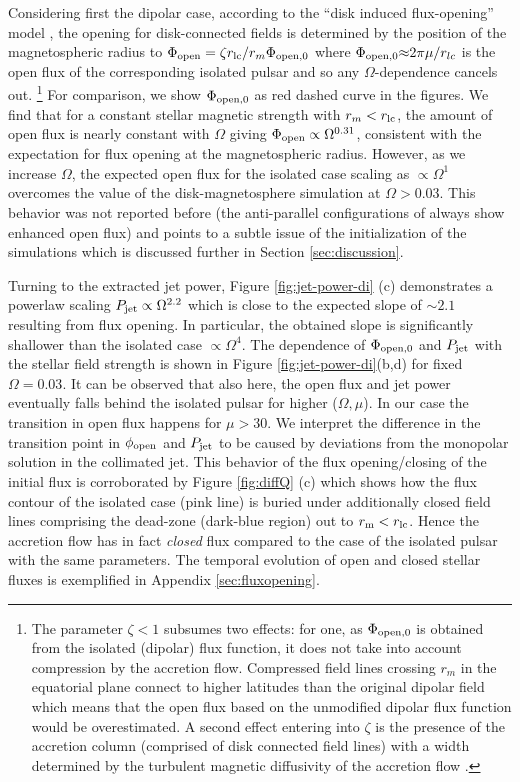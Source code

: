 \documentclass[fleqn,usenatbib]{mnras}
\begin{document}
Considering first the dipolar case, according to the ``disk induced flux-opening'' model  \citep{MattPudritz2005,Parfrey2016}, the opening for disk-connected fields is determined by the position of the magnetospheric radius to $\Phi_{\rm open} = \zeta r_{\rm lc}/r_m \Phi_{\rm open,0}$ where
$\Phi_{\rm open,0} \mathbf{\approx} 2\pi \mu/r_{lc}$ is the open flux of the corresponding isolated pulsar and so any $\Omega$-dependence cancels out.%
%
\footnote{The parameter $\zeta<1$ subsumes two effects: for one, as $\Phi_{\rm open,0}$ is obtained from the isolated (dipolar) flux function, it does not take into account compression by the accretion flow.  Compressed field lines crossing $r_m$ in the equatorial plane connect to higher latitudes than the original dipolar field which means that the open flux based on the unmodified dipolar flux function would be overestimated.  A second effect entering into $\zeta$ is the presence of the accretion column (comprised of disk connected field lines) with a width determined by the turbulent magnetic diffusivity of the accretion flow \citep{ParfreySpitkovskyEtAl2017}.}    
%
For comparison, we show $\Phi_{\rm open,0}$ as red dashed curve in the figures.
We find that for a constant stellar magnetic strength with $r_m < r_{\rm lc}$, the amount of open flux is nearly constant with $\Omega$ giving $\Phi_{\rm open} \propto \Omega^{0.31}$, consistent with the expectation for flux opening at the magnetospheric radius.  
However, as we increase $\Omega$, the expected open flux for the isolated case scaling as $\propto\Omega^1$ overcomes the value of the disk-magnetosphere simulation at $\Omega>0.03$.  This behavior was not reported before (the anti-parallel configurations of  always show enhanced open flux) and points to a subtle issue of the initialization of the simulations which is discussed further in Section \ref{sec:discussion}.  

Turning to the extracted jet power, Figure \ref{fig:jet-power-di} (c) demonstrates a powerlaw scaling $P_{\rm jet} \propto \Omega^{2.2}$ which is close to the expected slope of $\sim 2.1$ resulting from flux opening.  In particular, the obtained slope is significantly shallower than the isolated case $\propto \Omega^4$.  
The dependence of $\Phi_{\rm open,0}$ and $P_{\rm jet}$ with the stellar field strength is shown in Figure \ref{fig:jet-power-di}(b,d) for fixed $\Omega = 0.03$. 
It can be observed that also here, the open flux and jet power eventually falls behind the isolated pulsar for higher ($\Omega,\mu$). In our case the transition in open flux happens for $\mu > 30$. We interpret the difference in the transition point in $\phi_{\rm open}$ and $P_{\rm jet}$ to be caused by deviations from the monopolar solution in the collimated jet. 
This behavior of the flux opening/closing of the initial flux is corroborated by Figure \ref{fig:diffQ} (c) which shows how the flux contour of the isolated case (pink line) is buried under additionally closed field lines comprising the dead-zone (dark-blue region) out to $r_{\rm m}<r_{\rm lc}$.  Hence the accretion flow has in fact \textit{closed} flux compared to the case of the isolated pulsar with the same parameters. The temporal evolution of open and closed stellar fluxes is exemplified in Appendix \ref{sec:fluxopening}.  
\end{document}
